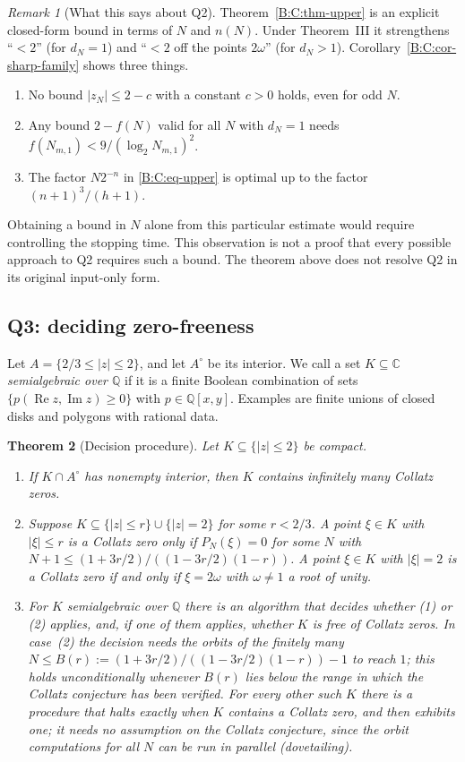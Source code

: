 \documentclass[11pt,a4paper]{article}
\newtheorem{theorem}{Theorem}[section]
\theoremstyle{definition}
\theoremstyle{remark}
\newtheorem{remark}[theorem]{Remark}
\numberwithin{equation}{section}
\begin{document}
\begin{remark}[What this says about Q2]\label{B:C:rem-Q2}
Theorem~\ref{B:C:thm-upper} is an explicit closed-form bound in terms of $N$ and
$n(N)$.  Under Theorem~III it strengthens ``$<2$'' (for $d_N=1$) and ``$<2$ off
the points $2\omega$'' (for $d_N>1$).  Corollary~\ref{B:C:cor-sharp-family} shows
three things.
\begin{enumerate}
\item No bound $|z_N|\le2-c$ with a constant $c>0$ holds, even for odd $N$.
\item Any bound $2-f(N)$ valid for all $N$ with $d_N=1$ needs
$f(N_{m,1})<9/(\log_2N_{m,1})^2$.
\item The factor $N2^{-n}$ in \eqref{B:C:eq-upper} is optimal up to the factor
$(n+1)^3/(h+1)$.
\end{enumerate}
Obtaining a bound in $N$ alone from this particular estimate would require
controlling the stopping time. This observation is not a proof that every
possible approach to Q2 requires such a bound. The theorem above does not
resolve Q2 in its original input-only form.
\end{remark}

\subsection{Q3: deciding zero-freeness}\label{B:C:ssec-Q3}

Let $A=\{2/3\le|z|\le2\}$, and let $A^\circ$ be its interior.  We call a set
$K\subseteq\mathbb C$ \emph{semialgebraic over $\mathbb Q$} if it is a finite
Boolean combination of sets $\{p(\operatorname{Re}z,\operatorname{Im}z)\ge0\}$ with
$p\in\mathbb Q[x,y]$.  Examples are finite unions of closed disks and polygons
with rational data.

\begin{theorem}[Decision procedure]\label{B:C:thm-decide}
Let $K\subseteq\{|z|\le2\}$ be compact.
\begin{enumerate}
\item If $K\cap A^\circ$ has nonempty interior, then $K$ contains infinitely many
Collatz zeros.
\item Suppose $K\subseteq\{|z|\le r\}\cup\{|z|=2\}$ for some $r<2/3$.  A point
$\xi\in K$ with $|\xi|\le r$ is a Collatz zero only if $P_N(\xi)=0$ for some $N$
with $N+1\le(1+3r/2)/((1-3r/2)(1-r))$.  A point $\xi\in K$ with $|\xi|=2$ is a
Collatz zero if and only if $\xi=2\omega$ with $\omega\ne1$ a root of unity.
\item For $K$ semialgebraic over $\mathbb Q$ there is an algorithm that decides
whether (1) or (2) applies, and, if one of them applies, whether $K$ is free of
Collatz zeros.  In case~(2) the decision needs the orbits of the finitely many
$N\le B(r):=(1+3r/2)/((1-3r/2)(1-r))-1$ to reach $1$; this holds unconditionally whenever
$B(r)$ lies below the range in which the Collatz conjecture has been verified.
For every other such $K$ there is a procedure that halts exactly
when $K$ contains a Collatz zero, and then exhibits one; it needs no assumption on
the Collatz conjecture, since the orbit computations for all $N$ can be run in parallel
(dovetailing).
\end{enumerate}
\end{theorem}
\end{document}
